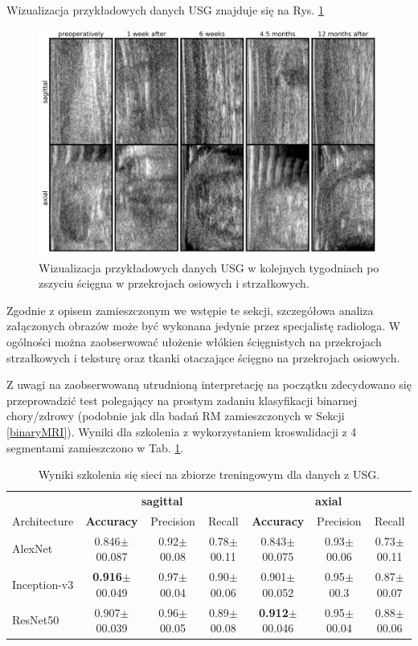 Wizualizacja przykładowych danych USG znajduje się na Rys. \ref{fig:US_sample}
\begin{figure}[h!]
	\includegraphics[width=\textwidth]{figures/Data_US_sample.png}
	\caption{Wizualizacja przykładowych danych USG w kolejnych tygodniach po zszyciu ścięgna w przekrojach osiowych i strzałkowych.}
	\label{fig:US_sample}
\end{figure}

Zgodnie z opisem zamieszczonym we wstępie te sekcji, szczegółowa analiza załączonych obrazów może być wykonana jedynie przez specjalistę radiologa. W ogólności można zaobserwować ułożenie włókien ścięgnistych na przekrojach strzałkowych i teksturę oraz tkanki otaczające ścięgno na przekrojach osiowych.

Z uwagi na zaobserwowaną utrudnioną interpretację na początku zdecydowano się przeprowadzić test polegający na prostym zadaniu klasyfikacji binarnej chory/zdrowy (podobnie jak dla badań RM zamieszczonych w Sekcji \ref{binaryMRI}). Wyniki dla szkolenia z wykorzystaniem kroswalidacji z 4 segmentami zamieszczono w Tab. \ref{tab:usg-binary}.

\begin{table}[t!]
	\scriptsize
	\centering
	\setlength{\tabcolsep}{3pt}
	\setlength\extrarowheight{2pt}
	\caption{Wyniki szkolenia się sieci na zbiorze treningowym dla danych z USG.}
	\label{tab:usg-binary}
	\begin{tabular}{l||c|c|c||c|c|c}
		& \multicolumn{3}{c}{\footnotesize{\textbf{sagittal}}} & \multicolumn{3}{c}{\footnotesize{\textbf{axial}}} \\
		Architecture & \textbf{Accuracy} & Precision & Recall & \textbf{Accuracy} & Precision & Recall \\ \hline
		AlexNet & 0.846$\pm$00.087 & 0.92$\pm$00.08 & 0.78$\pm$00.11 & 0.843$\pm$00.075 & 0.93$\pm$00.06 & 0.73$\pm$00.11  \\ \hline
		Inception-v3 & \textbf{0.916}$\pm$00.049 & 0.97$\pm$00.04 & 0.90$\pm$00.06 & 0.901$\pm$00.052 & 0.95$\pm$00.3 & 0.87$\pm$00.07 \\ \hline
		ResNet50 & 0.907$\pm$00.039 & 0.96$\pm$00.05 & 0.89$\pm$00.08 & \textbf{0.912}$\pm$00.046 & 0.95$\pm$00.04 & 0.88$\pm$00.06 \\ \hline
	\end{tabular}
\end{table}


